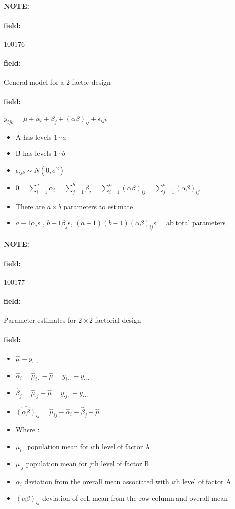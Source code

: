 \documentclass[12pt]{article}
\newenvironment{note}{\paragraph{NOTE:}}{}
\newenvironment{field}{\paragraph{field:}}{}
\begin{document}
\begin{note}
 \begin{field}
  \tiny 100176
 \end{field}
 \begin{field}
  General model for a 2-factor design
 \end{field}
 \begin{field}
  $y_{ijk} = \mu + \alpha_i + \beta_j + (\alpha\beta)_{ij} + \epsilon_{ijk}$
  \begin{itemize}
   \item A has levels $1 \cdots a$
   \item B has levels $1 \cdots b$
   \item $\epsilon_{ijk} \sim N(0,\sigma^2)$
   \item $0 = \sum_{i=1}^a \alpha_i = \sum_{j=1}^b \beta_j = \sum_{i=1}^a (\alpha\beta)_{ij} = \sum_{j=1}^b (\alpha\beta)_{ij}$
   \item There are $a \times b $ parameters to estimate
   \item $a-1 \alpha_i$s , $b-1 \beta_j$s, $(a-1)(b-1) (\alpha\beta)_{ij}$s = ab total parameters
  \end{itemize}
 \end{field}
\end{note}

\begin{note}
 \begin{field}
  \tiny 100177
 \end{field}
 \begin{field}
  Parameter estimates for $2 \times 2$ factorial design
 \end{field}
 \begin{field}
  \begin{itemize}
   \item $\hat{\mu} = \bar{y}_{\cdot\cdot \cdot}$
   \item $\hat{\alpha}_i = \hat{\mu}_{i\cdot} - \hat{\mu} = \bar{y}_{i\cdot \cdot} - \bar{y}_{\cdot \cdot \cdot }$
   \item $\hat{\beta}_j =\hat{\mu}_{\cdot j} - \hat{\mu} = \bar{y}_{\cdot j \cdot} - \bar{y}_{\cdot \cdot \cdot } $
   \item $\hat{(\alpha\beta)}_{ij} = \hat{\mu}_{ij} - \hat{\alpha}_i - \hat{\beta}_j - \hat{\mu}$
   \item Where :


   \item $\mu_{i\cdot }$ population mean for $i$th level of factor A
   \item $\mu_{\cdot j}$ population mean for $j$th level of factor B
   \item $\alpha_i$ deviation from the overall mean associated with $i$th level of factor A
   \item $(\alpha\beta)_{ij}$ deviation of cell mean from the row column and overall mean
  \end{itemize}
 \end{field}
\end{note}
\end{document}

